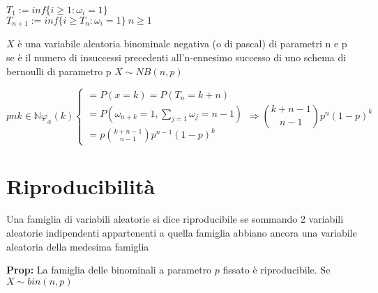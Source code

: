 \documentclass[11pt, letterpaper]{article}
\begin{document}
$T_{1}:=inf\{i\geq 1: \omega_{i}=1\}$\\
$T_{n+1}:=inf\{i\geq T_{n}: \omega_{i}=1\}\ n\geq 1$

$X$ è una variabile aleatoria binominale negativa (o di pascal) di parametri n e p se è il numero di insuccessi precedenti
all'n-ennesimo successo di uno schema di bernoulli di parametro p $X\sim NB(n,p)$

\begin{equation}
    pn k\in\mathbb{N} \varphi_{x}(k)
    \begin{cases}
        = P(x=k)=P(T_{n}=k+n)\\
        = P(\omega_{n+k}=1,\sum_{j=1}\omega_{j}=n-1)\\
        = p \binom{k+n-1}{n-1} p^{n-1}(1-p)^{k} 
    \end{cases}    
    \Rightarrow \binom{k+n-1}{n-1} p^{n}(1-p)^{k} 
\end{equation}

\section{Riproducibilità}
Una famiglia di variabili aleatorie si dice riproducibile se sommando 2 variabili aleatorie indipendenti appartenenti
a quella famiglia abbiano ancora una variabile aleatoria della medesima famiglia

\textbf{Prop:} La famiglia delle binominali a parametro $p$ fissato è riproducibile. Se $X\sim bin(n,p)$
\end{document}
